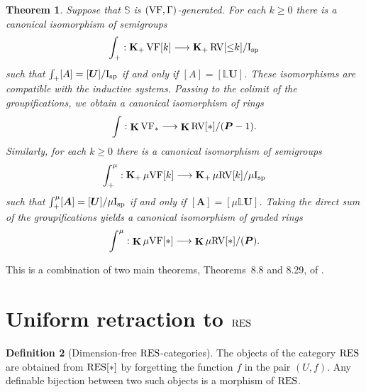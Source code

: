 \documentclass[12pt]{amsart}
\theoremstyle{plain}
\newtheorem{thm}{Theorem}[section]
\theoremstyle{definition}
\newtheorem{defn}[thm]{Definition}
\theoremstyle{remark}
\newtheorem{nota}[thm]{Notation}
\numberwithin{equation}{section}
\theoremstyle{plain}
\newcommand{\VF}{\textup{VF}}
\newcommand{\RV}{\textup{RV}}
\newcommand{\0}{\emptyset}
\newcommand{\bb}[1]{\mathbb{#1}}
\newcommand{\fun}{\longrightarrow}
\newcommand{\sub}{\subseteq}
\newcommand{\mgVF}{{\mu} {\VF}}
\newcommand{\mgRV}{{\mu}{\RV}}
\newcommand{\RES}{\textup{RES}}
\newcommand{\isp}{\textup{I}_{\textup{sp}}}
\newcommand{\mgisp}{\mu \isp}
\newcommand{\mgL}{{\mu}{\bb L}}
\DeclareMathOperator{\gsk}{\mathbf{K}_+}
\DeclareMathOperator{\ggk}{\mathbf{K}}
\begin{document}
\begin{thm}\label{main:prop:HK}
Suppose that $\mathbb{S}$ is $(\VF, \Gamma)$-generated. For each $k \geq 0$ there is a canonical isomorphism of semigroups
\[
\int_{+} : \gsk  \VF[k] \fun \gsk  \RV[{\leq}k] /  \isp
\]
such that $ \int_{+} [A] = [\bm U]/  \isp$ if and only if $[A] = [{\bb L}{\bm U}]$. These isomorphisms are  compatible with the inductive systems. Passing to  the colimit of the groupifications, we obtain a canonical isomorphism of rings
\[
\int : \ggk \VF_* \fun \ggk  \RV[*] /  (\bm P - 1).
\]
Similarly, for each $k \geq 0$ there is a canonical isomorphism of semigroups
\[
\int_{+}^\mu : \gsk  \mgVF[k] \fun \gsk  \mgRV[k] /  \mgisp
\]
such that $\int_{+}^{\mu} [\bm A] = [\bm U]/  \mgisp$  if and only if $[\bm A] = [{\mgL}{\bm U}]$.
Taking the direct sum of the groupifications yields a canonical isomorphism of graded rings
\[
\int^\mu : \ggk \mgVF[*] \fun \ggk  \mgRV[*] /  (\bm P).
\]
\end{thm}

This is a combination of two main theorems, Theorems~8.8 and 8.29, of \cite{hrushovski:kazhdan:integration:vf}.

\section{Uniform retraction to $\RES$}
\label{sec:retract}


\begin{defn}[Dimension-free $\RES$-categories]\label{df:res}
The objects of the category $\RES$ are obtained from $\RES[*]$ by forgetting the function $f$ in the pair $(U, f)$. Any definable bijection between two such objects is a morphism of $\RES$.
\end{defn}

\end{document}
